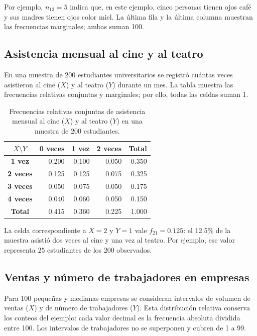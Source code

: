 Por ejemplo, $n_{12}=5$ indica que, en este ejemplo, cinco personas tienen ojos café y sus madres tienen ojos color miel. La última fila y la última columna muestran las frecuencias marginales; ambas suman 100.

\subsection{Asistencia mensual al cine y al teatro}

En una muestra de 200 estudiantes universitarios se registró cuántas veces asistieron al cine ($X$) y al teatro ($Y$) durante un mes. La tabla muestra las frecuencias relativas conjuntas y marginales; por ello, todas las celdas suman 1.

\begin{table}[H]
\centering
\small
\renewcommand{\arraystretch}{1.15}
\begin{tabular}{|c|r|r|r|r|}
\hline
$X\setminus Y$ & \textbf{0 veces} & \textbf{1 vez} & \textbf{2 veces} & \textbf{Total} \\ \hline
\textbf{1 vez} & 0.200 & 0.100 & 0.050 & 0.350 \\ \hline
\textbf{2 veces} & 0.125 & 0.125 & 0.075 & 0.325 \\ \hline
\textbf{3 veces} & 0.050 & 0.075 & 0.050 & 0.175 \\ \hline
\textbf{4 veces} & 0.040 & 0.060 & 0.050 & 0.150 \\ \hline
\textbf{Total} & 0.415 & 0.360 & 0.225 & 1.000 \\ \hline
\end{tabular}
\caption{Frecuencias relativas conjuntas de asistencia mensual al cine ($X$) y al teatro ($Y$) en una muestra de 200 estudiantes.}
\label{tab:asistencia-cine-teatro}
\end{table}

La celda correspondiente a $X=2$ y $Y=1$ vale $f_{21}=0.125$: el 12.5\% de la muestra asistió dos veces al cine y una vez al teatro. Por ejemplo, ese valor representa $25$ estudiantes de los 200 observados.

\subsection{Ventas y número de trabajadores en empresas}

Para 100 pequeñas y medianas empresas se consideran intervalos de volumen de ventas ($X$) y de número de trabajadores ($Y$). Esta distribución relativa conserva los conteos del ejemplo: cada valor decimal es la frecuencia absoluta dividida entre 100. Los intervalos de trabajadores no se superponen y cubren de 1 a 99.

